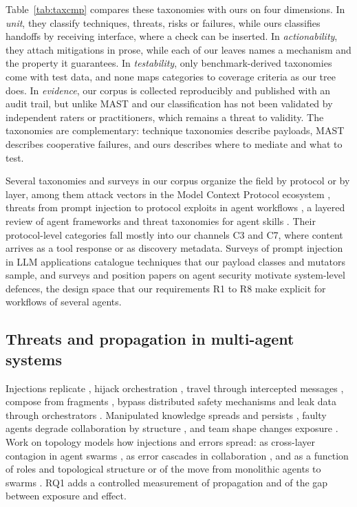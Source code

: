 \documentclass[pdflatex,sn-mathphys-num]{sn-jnl}
\theoremstyle{thmstyleone}%
\theoremstyle{thmstyletwo}%
\theoremstyle{thmstylethree}%
\begin{document}
Table~\ref{tab:taxcmp} compares these taxonomies with ours on four dimensions. In \emph{unit}, they classify techniques, threats, risks or failures, while ours classifies handoffs by receiving interface, where a check can be inserted. In \emph{actionability}, they attach mitigations in prose, while each of our leaves names a mechanism and the property it guarantees. In \emph{testability}, only benchmark-derived taxonomies come with test data, and none maps categories to coverage criteria as our tree does. In \emph{evidence}, our corpus is collected reproducibly and published with an audit trail, but unlike MAST and \citet{humbatova2020taxonomy} our classification has not been validated by independent raters or practitioners, which remains a threat to validity. The taxonomies are complementary: technique taxonomies describe payloads, MAST describes cooperative failures, and ours describes where to mediate and what to test.

Several taxonomies and surveys in our corpus organize the field by protocol or by layer, among them attack vectors in the Model Context Protocol ecosystem \citep{Song2025BeyondTPAE}, threats from prompt injection to protocol exploits in agent workflows \citep{Ferrag2025FromPIB}, a layered review of agent frameworks \citep{Xu2026SecurityAAJ} and threat taxonomies for agent skills \citep{Li2026TowardsSABM}. Their protocol-level categories fall mostly into our channels C3 and C7, where content arrives as a tool response or as discovery metadata. Surveys of prompt injection in LLM applications \citep{Cao2026ASSM,Geng2025PromptIABB,Rababah2024SoKPHBH,McHugh2025PromptI2F} catalogue techniques that our payload classes and mutators sample, and surveys and position papers on agent security \citep{Witt2025OpenCIBE,Siu2026AgentSNZ,Xiang2026ArchitectingSAAP,Ling2026TowardSLG} motivate system-level defences, the design space that our requirements R1 to R8 make explicit for workflows of several agents.

\subsection{Threats and propagation in multi-agent systems}

Injections replicate \citep{lee2024promptinfection}, hijack orchestration \citep{triedman2025mas}, travel through intercepted messages \citep{he2025aitm}, compose from fragments \citep{arif2026conjunctive}, bypass distributed safety mechanisms \citep{shahroz2025siege} and leak data through orchestrators \citep{naik2026omnileak}. Manipulated knowledge spreads and persists \citep{ju2024flooding}, faulty agents degrade collaboration by structure \citep{huang2025faulty}, and team shape changes exposure \citep{hagag2026architecture,Yu2025NetSafeETBB}. Work on topology models how injections and errors spread: as cross-layer contagion in agent swarms \citep{Le2026CrosslayerCOAI}, as error cascades in collaboration \citep{Xie2026FromSTBA}, and as a function of roles and topological structure \citep{Zhu2025MASTERMSR} or of the move from monolithic agents to swarms \citep{Malla2026FromMTI}. RQ1 adds a controlled measurement of propagation and of the gap between exposure and effect.
\end{document}
